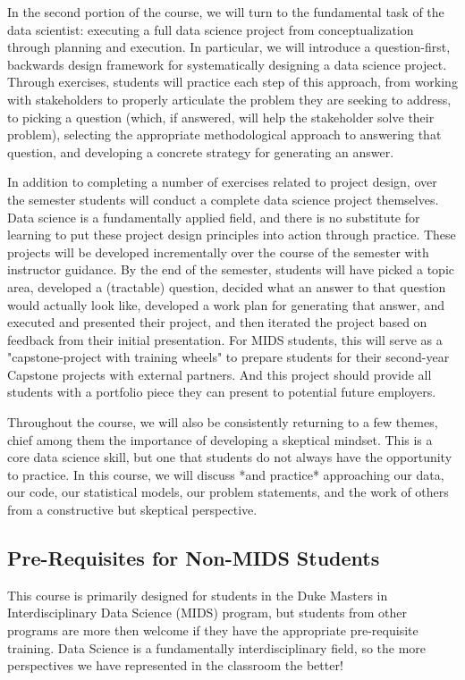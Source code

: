 \documentclass[12pt]{article}
\begin{document}
In the second portion of the course, we will turn to the fundamental task of the data scientist: executing a full data science project from conceptualization through planning and execution. In particular, we will introduce a question-first, backwards design framework for systematically designing a data science project. Through exercises, students will practice each step of this approach, from working with stakeholders to properly articulate the problem they are seeking to address, to picking a question (which, if answered, will help the stakeholder solve their problem), selecting the appropriate methodological approach to answering that question, and developing a concrete strategy for generating an answer.

In addition to completing a number of exercises related to project design, over the semester students will conduct a complete data science project themselves. Data science is a fundamentally applied field, and there is no substitute for learning to put these project design principles into action through practice. These projects will be developed incrementally over the course of the semester with instructor guidance. By the end of the semester, students will have picked a topic area, developed a (tractable) question, decided what an answer to that question would actually look like, developed a work plan for generating that answer, and executed and presented their project, and then iterated the project based on feedback from their initial presentation. For MIDS students, this will serve as a "capstone-project with training wheels" to prepare students for their second-year Capstone projects with external partners. And this project should provide all students with a portfolio piece they can present to potential future employers. 

Throughout the course, we will also be consistently returning to a few themes, chief among them the importance of developing a skeptical mindset. This is a core data science skill, but one that students do not always have the opportunity to practice. In this course, we will discuss *and practice* approaching our data, our code, our statistical models, our problem statements, and the work of others from a constructive but skeptical perspective.

\subsection{Pre-Requisites for Non-MIDS Students}

This course is primarily designed for students in the Duke Masters in Interdisciplinary Data Science (MIDS) program, but students from other programs are more then welcome if they have the appropriate pre-requisite training. Data Science is a fundamentally interdisciplinary field, so the more perspectives we have represented in the classroom the better!
\end{document}
